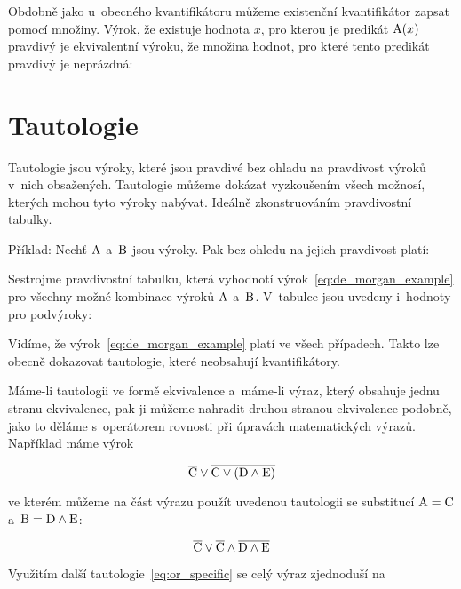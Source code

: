 Obdobně jako u~obecného kvantifikátoru můžeme existenční kvantifikátor zapsat pomocí množiny. Výrok, že existuje hodnota \(x\), pro kterou je predikát \(\mathrm{A}(x)\) pravdivý je ekvivalentní výroku, že množina hodnot, pro které tento predikát pravdivý je neprázdná:


\section{Tautologie}

Tautologie jsou výroky, které jsou pravdivé bez ohladu na pravdivost výroků v~nich obsažených. Tautologie můžeme dokázat vyzkoušením všech možnosí, kterých mohou tyto výroky nabývat. Ideálně zkonstruováním pravdivostní tabulky.

Příklad: Nechť \(\mathrm{A}\) a~\(\mathrm{B}\) jsou výroky. Pak bez ohledu na jejich pravdivost platí:


Sestrojme pravdivostní tabulku, která vyhodnotí výrok~\eqref{eq:de_morgan_example} pro všechny možné kombinace výroků \(\mathrm{A}\) a~\(\mathrm{B}\). V~tabulce jsou uvedeny i~hodnoty pro podvýroky:


Vidíme, že výrok~\eqref{eq:de_morgan_example} platí ve všech případech. Takto lze obecně dokazovat tautologie, které neobsahují kvantifikátory.

Máme-li tautologii ve formě ekvivalence a~máme-li výraz, který obsahuje jednu stranu ekvivalence, pak ji můžeme nahradit druhou stranou ekvivalence podobně, jako to děláme s~operátorem rovnosti při úpravách matematických výrazů. Například máme výrok

\begin{equation}
\overline{\mathrm{C}} \lor \overline{\mathrm{C} \lor (\mathrm{D} \land \mathrm{E})}
\end{equation}

ve kterém můžeme na část výrazu použít uvedenou tautologii se substitucí \(\mathrm{A} = \mathrm{C}\) a~\(\mathrm{B} = \mathrm{D} \land \mathrm{E}\):

\begin{equation}
\overline{\mathrm{C}} \lor \overline{\mathrm{C}} \land \overline{\mathrm{D} \land \mathrm{E}}
\end{equation}

Využitím další tautologie~\eqref{eq:or_specific} se celý výraz zjednoduší na

